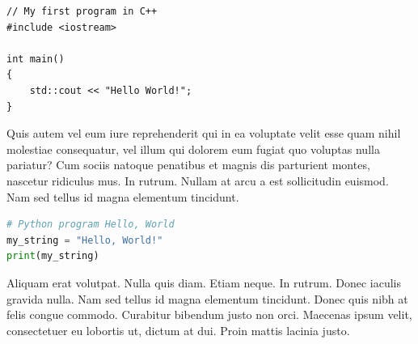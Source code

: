\begin{lstlisting}[label=src:CppListing,caption={Program Hello world in C++ language}]
// My first program in C++
#include <iostream>

int main()
{
	std::cout << "Hello World!";
}
\end{lstlisting}

Quis autem vel eum iure reprehenderit qui in ea voluptate velit esse quam nihil molestiae consequatur, vel illum qui dolorem eum fugiat quo voluptas nulla pariatur? Cum sociis natoque penatibus et magnis dis parturient montes, nascetur ridiculus mus. In rutrum. Nullam at arcu a est sollicitudin euismod. Nam sed tellus id magna elementum tincidunt.

\begin{lstlisting}[language=Python,label=src:PythonListing,caption={Program Hello world in Python language}]
# Python program Hello, World
my_string = "Hello, World!"
print(my_string)
\end{lstlisting}

Aliquam erat volutpat. Nulla quis diam. Etiam neque. In rutrum. Donec iaculis gravida nulla. Nam sed tellus id magna elementum tincidunt. Donec quis nibh at felis congue commodo. Curabitur bibendum justo non orci. Maecenas ipsum velit, consectetuer eu lobortis ut, dictum at dui. Proin mattis lacinia justo.
\endinput